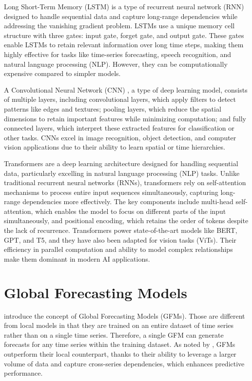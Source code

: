 \documentclass[12pt,a4paper]{book}
\begin{document}
\label{lstm}
Long Short-Term Memory (LSTM) \citep{lstmhochreiter1997long} is a type of recurrent neural network (RNN) designed to handle sequential data and capture long-range dependencies while addressing the vanishing gradient problem. LSTMs use a unique memory cell structure with three gates: input gate, forget gate, and output gate. These gates enable LSTMs to retain relevant information over long time steps, making them highly effective for tasks like time-series forecasting, speech recognition, and natural language processing (NLP). However, they can be computationally expensive compared to simpler models.

A Convolutional Neural Network (CNN) \citep{lecun_convolutional_1995}, a type of deep learning model, consists of multiple layers, including convolutional layers, which apply filters to detect patterns like edges and textures; pooling layers, which reduce the spatial dimensions to retain important features while minimizing computation; and fully connected layers, which interpret these extracted features for classification or other tasks. CNNs excel in image recognition, object detection, and computer vision applications due to their ability to learn spatial or time hierarchies.

Transformers \citep{transvaswani_attention_2023} are a deep learning architecture designed for handling sequential data, particularly excelling in natural language processing (NLP) tasks. Unlike traditional recurrent neural networks (RNNs), transformers rely on self-attention mechanisms to process entire input sequences simultaneously, capturing long-range dependencies more effectively. The key components include multi-head self-attention, which enables the model to focus on different parts of the input simultaneously, and positional encoding, which retains the order of tokens despite the lack of recurrence. Transformers power state-of-the-art models like BERT, GPT, and T5, and they have also been adapted for vision tasks (ViTs). Their efficiency in parallel computation and ability to model complex relationships make them dominant in modern AI applications.

\section{Global Forecasting Models}
\citet{januschowski_criteria_2020} introduce the concept of Global Forecasting Models (GFMs). Those are different from local models in that they are trained on an entire dataset of time series rather than on a single time series. Therefore, a single GFM can generate forecasts for any time series within the training dataset. As noted by \citet{hewamalage_recurrent_2021}, GFMs outperform their local counterpart, thanks to their ability to leverage a larger volume of data and capture cross-series dependencies, which enhances predictive performance.
\end{document}
